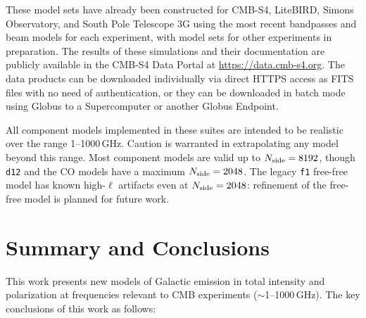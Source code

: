 \documentclass[twocolumn]{aastex631}
\begin{document}
These model sets have already been constructed for CMB-S4, LiteBIRD, Simons Observatory, and South Pole Telescope 3G using the most recent bandpasses and beam models for each experiment, with model sets for other experiments in preparation. The results of these simulations and their documentation are publicly available in the CMB-S4 Data Portal at \url{https://data.cmb-s4.org}. The data products can be downloaded individually via direct HTTPS access as FITS files with no need of authentication, or they can be downloaded in batch mode using Globus to a Supercomputer or another Globus Endpoint.

All component models implemented in these suites are intended to be realistic over the range 1--1000\,GHz. Caution is warranted in extrapolating any model beyond this range. Most component models are valid up to $N_{\rm side}=8192$, though \texttt{d12} and the CO models have a maximum $N_{\rm side}=2048$. The legacy \texttt{f1} free-free model has known high-$\ell$ artifacts even at $N_{\rm side} = 2048$: refinement of the free-free model is planned for future work.

\section{Summary and Conclusions} \label{sec:summary}

This work presents new models of Galactic emission in total intensity and polarization at frequencies relevant to CMB experiments ($\sim$1--1000\,GHz). The key conclusions of this work as follows:
\end{document}
